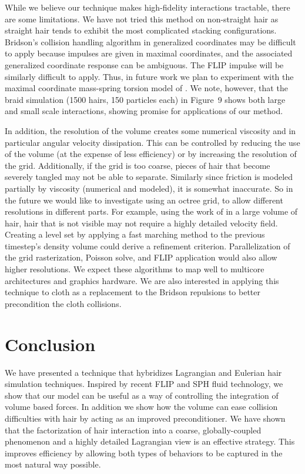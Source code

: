 While we believe our technique makes high-fidelity interactions tractable, there
are some limitations.  We have not tried this method on non-straight hair as
straight hair tends to exhibit the most complicated stacking
configurations. Bridson's collision handling algorithm in
generalized coordinates may be difficult to apply because
impulses are given in maximal coordinates, and the associated generalized
coordinate response can be ambiguous. The FLIP impulse will be similarly
difficult to apply. Thus, in future work we plan to experiment with the maximal
coordinate mass-spring torsion model of \cite{selle:2008:hair}.
We note, however, that the braid simulation (1500 hairs, 150 particles
each) in Figure~9
shows both large and small scale interactions, showing promise for applications
of our method.  

In addition, the resolution of the
volume creates some numerical viscosity and in particular angular velocity
dissipation. This can be controlled by reducing the use of the volume (at the
expense of less efficiency) or by increasing the resolution of the
grid. Additionally, if the grid is too coarse, pieces of hair that become
severely tangled may not be able to separate. Similarly since friction is
modeled partially by viscosity (numerical and modeled), it is somewhat
inaccurate. So in the future we would like to investigate using an octree grid,
to allow different resolutions in different parts. For example, using the work of
\cite{ward:2003:modeling-hair-lod} in a large volume of hair, hair that is not
visible may not require a highly detailed velocity field.  Creating a level set
by applying a fast marching method to the previous timestep's density volume
could derive a refinement criterion. Parallelization of the grid rasterization,
Poisson solve, and FLIP application would also allow higher resolutions. We
expect these algorithms to map well to multicore architectures and graphics hardware. 
We are also interested in applying this technique to cloth as a
replacement to the Bridson repulsions to better precondition the cloth
collisions.


\vspace{-2pt}
\section{Conclusion}
\vspace{-4pt}

We have presented a technique that hybridizes Lagrangian and Eulerian hair
simulation techniques. Inspired by recent FLIP and SPH fluid technology, we show
that our model can be useful as a way of controlling the integration of volume
based forces. In addition we show how the volume can ease collision difficulties
with hair by acting as an improved preconditioner. We have shown that the
factorization of hair interaction into a coarse, globally-coupled phenomenon and a
highly detailed Lagrangian view is an effective strategy.  This improves
efficiency by allowing both types of behaviors to be captured in the most
natural way possible. 


